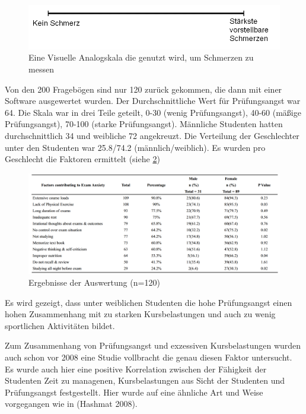 \documentclass[11pt, a4paper]{article}
\begin{document}
	\begin{figure}[p]
		\centering
		\includegraphics{img/VAS.png}
		\caption{Eine Visuelle Analogskala die genutzt wird, um Schmerzen zu messen \cite{hashmat2008factors}}
		\label{fig:vas}
	\end{figure}

	Von den 200 Fragebögen sind nur 120 zurück gekommen, die dann mit einer Software ausgewertet wurden. Der Durchschnittliche Wert für Prüfungsangst war 64. Die Skala war in drei Teile geteilt, 0-30 (wenig Prüfungsangst), 40-60 (mäßige Prüfungsangst), 70-100 (starke Prüfungsangst). Männliche Studenten hatten durchschnittlich 34 und weibliche 72 angekreuzt. Die Verteilung der Geschlechter unter den Studenten war 25.8/74.2 (männlich/weiblich). Es wurden pro Geschlecht die Faktoren ermittelt (siehe \cref{fig:jpmatable}) \cite{hashmat2008factors}

	\begin{figure}[p]
		\centering
		\includegraphics[scale=0.5]{img/jpma_table.png}
		\caption{Ergebnisse der Auswertung (n=120) \cite{hashmat2008factors}}
		\label{fig:jpmatable}
	\end{figure}

	Es wird gezeigt, dass unter weiblichen Studenten die hohe Prüfungsangst einen hohen Zusammenhang mit zu starken Kursbelastungen und auch zu wenig sportlichen Aktivitäten bildet. \cite{hashmat2008factors}

	Zum Zusammenhang von Prüfungsangst und exzessiven Kursbelastungen wurden auch schon vor 2008 eine Studie vollbracht die genau diesen Faktor untersucht. Es wurde auch hier eine positive Korrelation zwischen der Fähigkeit der Studenten Zeit zu managenen,  Kursbelastungen aus Sicht der Studenten und Prüfungsangst festgestellt. Hier wurde auf eine ähnliche Art und Weise vorgegangen wie in (Hashmat 2008). \cite{sansgiry2006effect}
\end{document}
